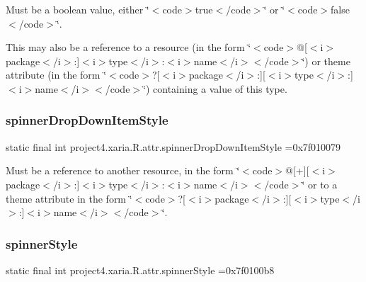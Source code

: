 Must be a boolean value, either \char`\"{}$<$code$>$true$<$/code$>$\char`\"{} or \char`\"{}$<$code$>$false$<$/code$>$\char`\"{}. 

This may also be a reference to a resource (in the form \char`\"{}$<$code$>$@\mbox{[}$<$i$>$package$<$/i$>$\+:\mbox{]}$<$i$>$type$<$/i$>$\+:$<$i$>$name$<$/i$>$$<$/code$>$\char`\"{}) or theme attribute (in the form \char`\"{}$<$code$>$?\mbox{[}$<$i$>$package$<$/i$>$\+:\mbox{]}\mbox{[}$<$i$>$type$<$/i$>$\+:\mbox{]}$<$i$>$name$<$/i$>$$<$/code$>$\char`\"{}) containing a value of this type. \mbox{\label{classproject4_1_1xaria_1_1R_1_1attr_a3e33fb61a801b75cdf8fee8b1831b1e6}} 
\subsubsection{\texorpdfstring{spinner\+Drop\+Down\+Item\+Style}{spinnerDropDownItemStyle}}
{\footnotesize\ttfamily static final int project4.\+xaria.\+R.\+attr.\+spinner\+Drop\+Down\+Item\+Style =0x7f010079\hspace{0.3cm}{\ttfamily [static]}}

Must be a reference to another resource, in the form \char`\"{}$<$code$>$@\mbox{[}+\mbox{]}\mbox{[}$<$i$>$package$<$/i$>$\+:\mbox{]}$<$i$>$type$<$/i$>$\+:$<$i$>$name$<$/i$>$$<$/code$>$\char`\"{} or to a theme attribute in the form \char`\"{}$<$code$>$?\mbox{[}$<$i$>$package$<$/i$>$\+:\mbox{]}\mbox{[}$<$i$>$type$<$/i$>$\+:\mbox{]}$<$i$>$name$<$/i$>$$<$/code$>$\char`\"{}. \mbox{\label{classproject4_1_1xaria_1_1R_1_1attr_af6301b118c4b70a4d89b9bd65ee934eb}} 
\subsubsection{\texorpdfstring{spinner\+Style}{spinnerStyle}}
{\footnotesize\ttfamily static final int project4.\+xaria.\+R.\+attr.\+spinner\+Style =0x7f0100b8\hspace{0.3cm}{\ttfamily [static]}}

